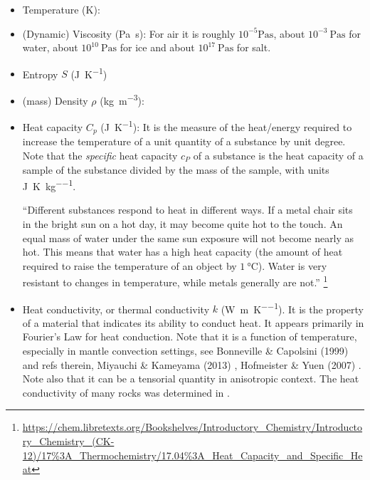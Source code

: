 \begin{itemize}
\item {\color{violet} Temperature} (\si{\kelvin}):

\item {\color{violet} (Dynamic) Viscosity} (\si{\pascal\second}): 
For air it is roughly $10^{-5}\si{\pascal\second}$, 
about $10^{-3}~\si{\pascal\second}$ for water, 
about $10^{10}~\si{\pascal\second}$ for ice and 
about $10^{17}~\si{\pascal\second}$ for salt. 

\item {\color{violet} Entropy} $S$ (\si{\joule\per\kelvin})

\item {\color{violet} (mass) Density} $\rho$ (\si{\kg\per\cubic\metre}):

\item {\color{violet} Heat capacity} $C_p$ (\si{\joule\per\kelvin}): 
It is the measure of the heat/energy required to increase the 
temperature of a unit quantity of a substance by unit degree. Note that the {\it specific} 
heat capacity $c_P$ of a substance is the heat capacity of a sample of the substance 
divided by the mass of the sample, with units \si{\joule\per\kelvin\per\kg}.

``Different substances respond to heat in different ways. If a metal chair sits in the bright sun 
on a hot day, it may become quite hot to the touch. An equal mass of water under the same sun exposure will 
not become nearly as hot. This means that water has a high heat capacity (the amount of heat required to 
raise the temperature of an object by $1~\si{\celsius}$). Water is very resistant to changes in temperature, 
while metals generally are not.''
\footnote{\url{https://chem.libretexts.org/Bookshelves/Introductory_Chemistry/Introductory_Chemistry_(CK-12)/17\%3A_Thermochemistry/17.04\%3A_Heat_Capacity_and_Specific_Heat}}


\item {\color{violet} Heat conductivity}, or thermal conductivity $k$ (\si{\watt\per\metre\per\kelvin}). 
It is the property of a material that indicates its ability to conduct heat. It appears primarily 
in Fourier's Law for heat conduction.
Note that it is a function of temperature, especially in mantle convection settings,
see Bonneville \& Capolsini (1999) \cite{boca99} and refs therein, 
Miyauchi \& Kameyama (2013) \cite{mika13}, Hofmeister \& Yuen (2007) \cite{hoyu07}. 
Note also that it can be a tensorial quantity in anisotropic context.
The heat conductivity of many rocks was determined in \cite{ando13}.


\end{itemize}
